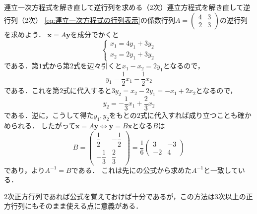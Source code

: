\begin{example}{連立一次方程式を解き直して逆行列を求める（2次）}{連立方程式を解き直して逆行列（2次）}
  \eqref{eq:連立一次方程式の行列表示}の係数行列$A = \begin{pmatrix} 4 & 3 \\ 2 & 3 \end{pmatrix}$の逆行列を求めよう．
  $\bm{x} = A\bm{y}$を成分でかくと
  \[
    \begin{cases}
      x_1 = 4y_1 + 3y_2 \\
      x_2 = 2y_1 + 3y_2
    \end{cases}
  \]
  である．第$1$式から第$2$式を辺々引くと$x_1 - x_2 = 2y_1$となるので，
  \[
    y_1 = \frac{1}{2}x_1 - \frac{1}{2}x_2
  \]
  である．これを第$2$式に代入すると$3y_2 = x_2 - 2y_1 = -x_1 + 2x_2$となるので，
  \[
    y_2 = -\frac{1}{3}x_1 + \frac{2}{3}x_2
  \]
  である．逆に，こうして得た$y_1,y_2$をもとの$2$式に代入すれば成り立つことも確かめられる．
  したがって$\bm{x} = A\bm{y} \iff \bm{y} = B\bm{x}$となる$B$は
  \[
    B =
    \begin{pmatrix}
      \dfrac{1}{2} & -\dfrac{1}{2} \\[1.5ex]
      -\dfrac{1}{3} & \dfrac{2}{3}
    \end{pmatrix}
    = \frac{1}{6} \begin{pmatrix} 3 & -3 \\ -2 & 4 \end{pmatrix}
  \]
  であり，より$A^{-1} = B$である．
  これは先にの公式から求めた$A^{-1}$と一致している．
\end{example}

$2$次正方行列であれば公式を覚えておけば十分であるが，この方法は$3$次以上の正方行列にもそのまま使える点に意義がある．


